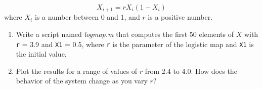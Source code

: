 
\begin{equation*}
X_{i+1} = r X_i (1-X_i)
\end{equation*}
where $X_i$ is a number between 0 and 1, and $r$ is a positive number.

\begin{enumerate}

\item Write a script named \emph{logmap.m} that computes the first 50
elements of $X$ with \lstinline{r} = 3.9 and \lstinline{X1} = 0.5, where
\lstinline{r} is the parameter of the logistic map and \lstinline{X1} is the
initial value.

\item Plot the results for a range of values of $r$ from 2.4 to 4.0.
How does the behavior of the system change as you vary $r$?

\end{enumerate}




